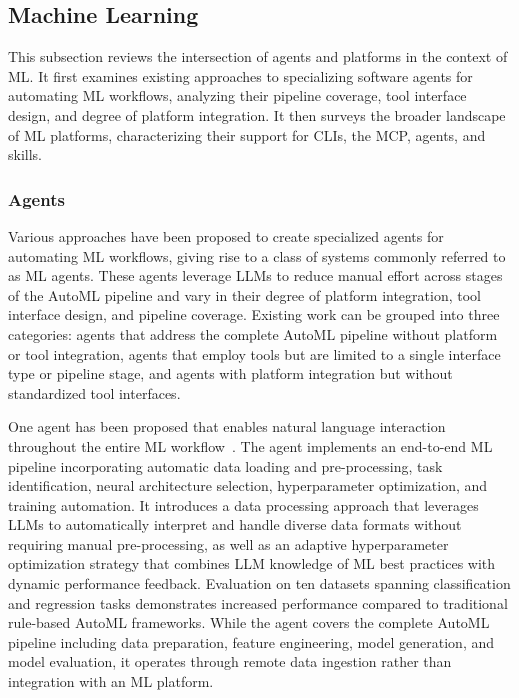 \documentclass[
english,                 %
bibtex,                  %
includeExtraAbstracts, %
]{kththesis}
\numberwithin{listing}{chapter}
\begin{document}
\subsection{Machine Learning}

This subsection reviews the intersection of agents and platforms in the context of \gls{ML}. It first examines existing approaches to specializing software agents for automating \gls{ML} workflows, analyzing their pipeline coverage, tool interface design, and degree of platform integration. It then surveys the broader landscape of \gls{ML} platforms, characterizing their support for \glspl{CLI}, the \gls{MCP}, agents, and skills.

\subsubsection{Agents}

Various approaches have been proposed to create specialized agents for automating ML workflows, giving rise to a class of systems commonly referred to as \gls{ML} agents. These agents leverage \glspl{LLM} to reduce manual effort across stages of the \gls{AutoML} pipeline and vary in their degree of platform integration, tool interface design, and pipeline coverage. Existing work can be grouped into three categories: agents that address the complete \gls{AutoML} pipeline without platform or tool integration, agents that employ tools but are limited to a single interface type or pipeline stage, and agents with platform integration but without standardized tool interfaces.

One agent has been proposed that enables natural language interaction throughout the entire \gls{ML} workflow~\cite{huang_human-centered_2025}. The agent implements an end-to-end \gls{ML} pipeline incorporating automatic data loading and pre-processing, task identification, neural architecture selection, hyperparameter optimization, and training automation. It introduces a data processing approach that leverages \glspl{LLM} to automatically interpret and handle diverse data formats without requiring manual pre-processing, as well as an adaptive hyperparameter optimization strategy that combines \gls{LLM} knowledge of \gls{ML} best practices with dynamic performance feedback. Evaluation on ten datasets spanning classification and regression tasks demonstrates increased performance compared to traditional rule-based \gls{AutoML} frameworks. While the agent covers the complete \gls{AutoML} pipeline including data preparation, feature engineering, model generation, and model evaluation, it operates through remote data ingestion rather than integration with an \gls{ML} platform.
\end{document}
